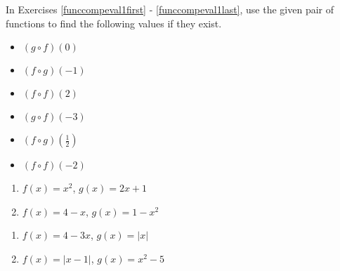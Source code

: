 
In Exercises \ref{funccompeval1first} - \ref{funccompeval1last}, use the given pair of functions to find the following values if they exist.

\begin{multicols}{3}

\begin{itemize}

\item  $(g\circ f)(0)$

\item  $(f\circ g)(-1)$

\item  $(f \circ f)(2)$

\end{itemize}

\end{multicols}

\begin{multicols}{3}

\begin{itemize}

\item  $(g\circ f)(-3)$

\item  $(f\circ g)\left(\frac{1}{2}\right)$

\item  $(f \circ f)(-2)$

\end{itemize}

\end{multicols}

\begin{multicols}{2}
\begin{enumerate}
\setcounter{enumi}{\value{HW}}

\item  $f(x) = x^2$, $g(x) = 2x+1$ \label{funccompeval1first}
\item  $f(x) = 4-x$, $g(x) = 1-x^2$

\setcounter{HW}{\value{enumi}}
\end{enumerate}
\end{multicols}

\begin{multicols}{2}
\begin{enumerate}
\setcounter{enumi}{\value{HW}}

\item  $f(x) = 4-3x$, $g(x) = |x|$
\item  $f(x) = |x-1|$, $g(x) = x^2-5$

\setcounter{HW}{\value{enumi}}
\end{enumerate}
\end{multicols}

